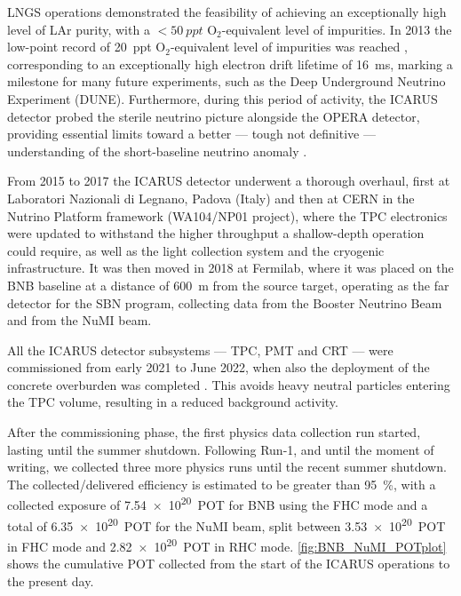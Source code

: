 LNGS operations demonstrated the feasibility of achieving an exceptionally high level of LAr purity, with a ${<}\SI{50}{ppt}$ O$_2$-equivalent level of impurities. In 2013 the low-point record of \SI{20}{ppt} O$_2$-equivalent level of impurities was reached \cite{antonelloExperimentalObservationExtremely2014}, corresponding to an exceptionally high electron drift lifetime of \SI{16}{\ms}, marking a milestone for many future experiments, such as the Deep Underground Neutrino Experiment (DUNE). Furthermore, during this period of activity, the ICARUS detector probed the sterile neutrino picture alongside the OPERA detector, providing essential limits toward a better --- tough not definitive --- understanding of the short-baseline neutrino anomaly \cite{antonelloSearchAnomaliesNeappearance2013, antonelloConclusiveConsiderationsComparison2015, agafonovaNewResultsNm2013}. 

From 2015 to 2017 the ICARUS detector underwent a thorough overhaul, first at Laboratori Nazionali di Legnano, Padova (Italy) and then at CERN in the Nutrino Platform framework (WA104/NP01 project), where the TPC electronics were updated to withstand the higher throughput a shallow-depth operation could require, as well as the light collection system and the cryogenic infrastructure. It was then moved in 2018 at Fermilab, where it was placed on the BNB baseline at a distance of \SI{600}{\m} from the source target, operating as the far detector for the SBN program, collecting data from the Booster Neutrino Beam and from the NuMI beam. 

All the ICARUS detector subsystems --- TPC, PMT and CRT --- were commissioned from early 2021 to June 2022, when also the deployment of the concrete overburden was completed \cite{abratenkoICARUSFermilabShortBaseline2023}. This avoids heavy neutral particles entering the TPC volume, resulting in a reduced background activity. 

After the commissioning phase, the first physics data collection run started, lasting until the summer shutdown. Following Run-1, and until the moment of writing, we collected three more physics runs until the recent summer shutdown. The collected/delivered efficiency is estimated to be greater than \SI{95}{\percent}, with a collected exposure of \SI{7.54e20}{POT} for BNB using the FHC mode and a total of \SI{6.35e20}{POT} for the NuMI beam, split between \SI{3.53e20}{POT} in FHC mode and \SI{2.82e20}{POT} in RHC mode. \autoref{fig:BNB_NuMI_POTplot} shows the cumulative POT collected from the start of the ICARUS operations to the present day. 

